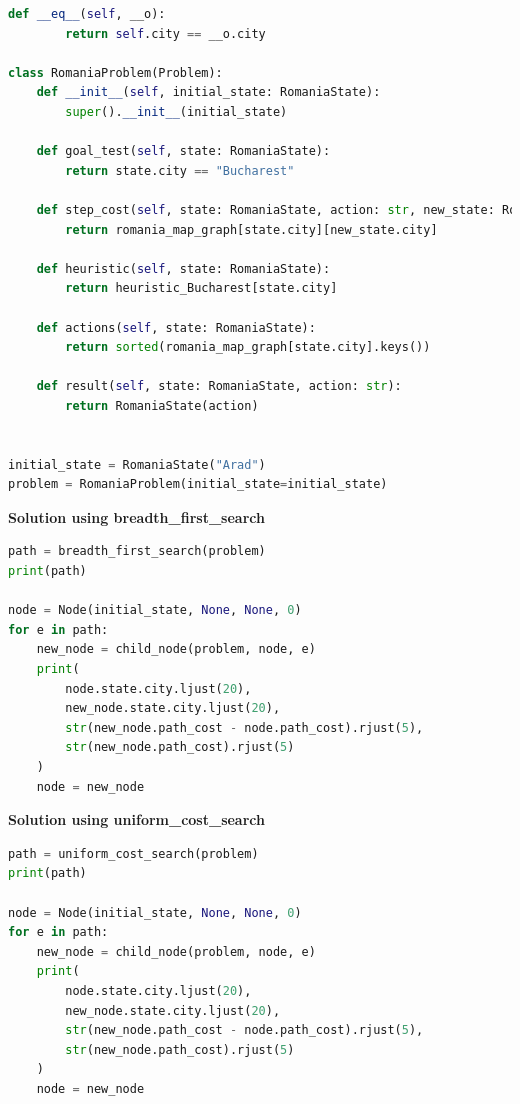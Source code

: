 \begin{lstlisting}[language=Python]
    def __eq__(self, __o):
        return self.city == __o.city

class RomaniaProblem(Problem):
    def __init__(self, initial_state: RomaniaState):
        super().__init__(initial_state)
    
    def goal_test(self, state: RomaniaState):
        return state.city == "Bucharest"
    
    def step_cost(self, state: RomaniaState, action: str, new_state: RomaniaState):
        return romania_map_graph[state.city][new_state.city]
    
    def heuristic(self, state: RomaniaState):
        return heuristic_Bucharest[state.city]
    
    def actions(self, state: RomaniaState):
        return sorted(romania_map_graph[state.city].keys())
    
    def result(self, state: RomaniaState, action: str):
        return RomaniaState(action)


initial_state = RomaniaState("Arad")
problem = RomaniaProblem(initial_state=initial_state)
\end{lstlisting}



{\centering \textbf{Solution using breadth\_first\_search} \par}

\begin{lstlisting}[language=Python]
path = breadth_first_search(problem)
print(path)

node = Node(initial_state, None, None, 0)
for e in path:
    new_node = child_node(problem, node, e)
    print(
        node.state.city.ljust(20), 
        new_node.state.city.ljust(20), 
        str(new_node.path_cost - node.path_cost).rjust(5), 
        str(new_node.path_cost).rjust(5)
    )
    node = new_node
\end{lstlisting}


{\centering \textbf{Solution using uniform\_cost\_search} \par}

\begin{lstlisting}[language=Python]
path = uniform_cost_search(problem)
print(path)

node = Node(initial_state, None, None, 0)
for e in path:
    new_node = child_node(problem, node, e)
    print(
        node.state.city.ljust(20), 
        new_node.state.city.ljust(20), 
        str(new_node.path_cost - node.path_cost).rjust(5), 
        str(new_node.path_cost).rjust(5)
    )
    node = new_node
\end{lstlisting}



